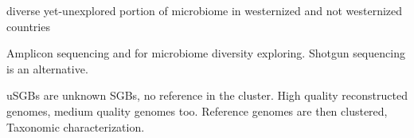 diverse yet-unexplored portion of microbiome in westernized and not westernized countries

Amplicon sequencing and for microbiome diversity exploring. 
Shotgun sequencing is an alternative.

uSGBs are unknown SGBs, no reference in the cluster. 
High quality reconstructed genomes, medium quality genomes too. Reference genomes are then clustered,
Taxonomic characterization.

